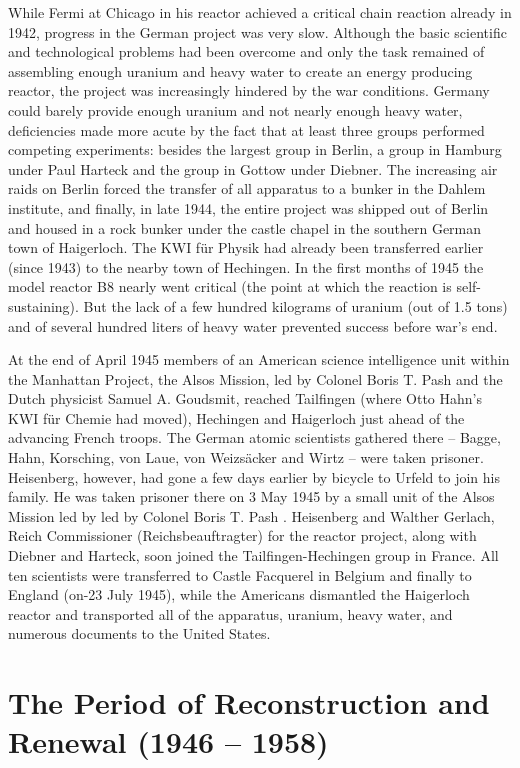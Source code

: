 \documentclass{article}
\begin{document}
While Fermi at Chicago in his reactor achieved a critical chain reaction already in 1942, progress in the German project was very slow. Although the basic scientific and technological problems had been overcome and only the task remained of assembling enough uranium and heavy water to create an energy producing reactor, the project was increasingly hindered by the war conditions. Germany could barely provide enough uranium and not nearly enough heavy water, deficiencies made more acute by the fact that at least three groups performed competing experiments: besides the largest group in Berlin, a group in Hamburg under Paul Harteck and the group in Gottow under Diebner. The increasing air raids on Berlin forced the transfer of all apparatus to a bunker in the Dahlem institute, and finally, in late 1944, the entire project was shipped out of Berlin and housed in a rock bunker under the castle chapel in the southern German town of Haigerloch. The KWI für Physik had already been transferred earlier (since 1943) to the nearby town of Hechingen. In the first months of 1945 the model reactor B8 nearly went critical (the point at which the reaction is self-sustaining). But the lack of a few hundred kilograms of uranium (out of 1.5 tons) and of several hundred liters of heavy water prevented success before war's end.

At the end of April 1945 members of an American science intelligence unit within the Manhattan Project, the Alsos Mission, led by Colonel Boris T. Pash and the Dutch physicist Samuel A. Goudsmit, reached Tailfingen (where Otto Hahn's KWI für Chemie had moved), Hechingen and Haigerloch just ahead of the advancing French troops. The German atomic scientists gathered there – Bagge, Hahn, Korsching, von Laue, von Weizsäcker and Wirtz – were taken prisoner. Heisenberg, however, had gone a few days earlier by bicycle to Urfeld to join his family. He was taken prisoner there on 3 May 1945 by a small unit of the Alsos Mission led by led by Colonel Boris T. Pash . Heisenberg and Walther Gerlach, Reich Commissioner (Reichsbeauftragter) for the reactor project, along with Diebner and Harteck, soon joined the Tailfingen-Hechingen group in France. All ten scientists were transferred to Castle Facquerel in Belgium and finally to England (on-23 July 1945), while the Americans dismantled the Haigerloch reactor and transported all of the apparatus, uranium, heavy water, and numerous documents to the United States.

\section{The Period of Reconstruction and Renewal (1946 – 1958)}
\end{document}
